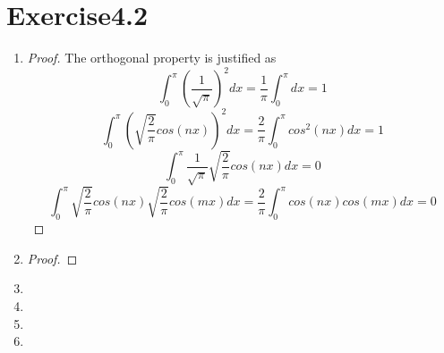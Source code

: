 \documentclass[paper=a4, fontsize=11pt]{scrartcl} %
\numberwithin{equation}{section} %
\numberwithin{figure}{section} %
\numberwithin{table}{section} %
\begin{document}
\section{Exercise4.2}
	\begin{enumerate}
		\item 
			\begin{proof}
				The orthogonal property is justified as
				\begin{equation}
					\int_{0}^{\pi} (\frac{1}{\sqrt{\pi}})^2 dx = \frac{1}{\pi} \int_{0}^{\pi} dx = 1
				\end{equation}
				\begin{equation}
					\int_{0}^{\pi} (\sqrt{\frac{2}{\pi}}cos(nx))^2 dx = \frac{2}{\pi} \int_{0}^{\pi} cos^2(nx)dx = 1
				\end{equation}
				\begin{equation}
					\int_{0}^{\pi} \frac{1}{\sqrt{\pi}} \sqrt{\frac{2}{\pi}}cos(nx) dx = 0
				\end{equation}
				\begin{equation}
					\int_{0}^{\pi} \sqrt{\frac{2}{\pi}}cos(nx) \sqrt{\frac{2}{\pi}}cos(mx) dx = \frac{2}{\pi} \int_{0}^{\pi} cos(nx) cos(mx) dx = 0
				\end{equation}
			\end{proof}
		\item 
			\begin{proof}
				
			\end{proof}
		
		\item 
		
		\item 
		
		\item 
		
		\item 
		
	\end{enumerate}
\end{document}
